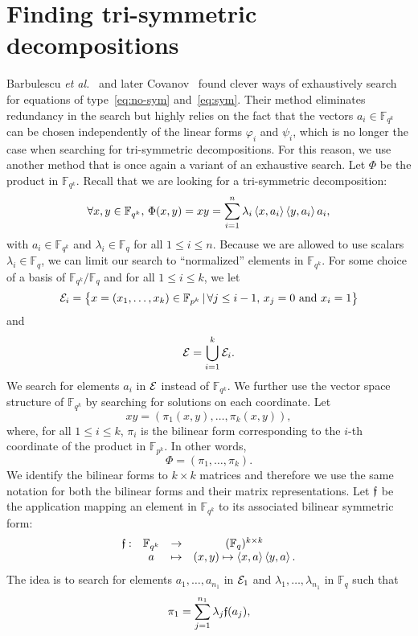 \documentclass[a4paper,11pt]{article}
\begin{document}
\section{Finding tri-symmetric decompositions}
\label{sec:algos}
Barbulescu \emph{et al.}~\cite{BDEZ12} and later Covanov~\cite{Covanov19} found
clever ways of exhaustively search for equations of type~\eqref{eq:no-sym}
and~\eqref{eq:sym}. Their method eliminates redundancy in the search but highly
relies on the fact that the vectors $a_i\in\mathbb{F}_{q^k}$ can be chosen independently of
the linear forms $\varphi_i$ and $\psi_i$, which is no longer
the case when searching for tri-symmetric decompositions. For this reason, we
use another method that is once again a variant of an exhaustive search. Let
$\Phi$ be the product in $\mathbb{F}_{q^k}$. Recall
that we are looking for a tri-symmetric decomposition:
\[
  \forall x, y\in\mathbb{F}_{q^k},\,\Phi(x, y) = xy =
  \sum_{i=1}^{n}\lambda_i\left\langle x,a_i\right\rangle\left\langle y,a_i\right\rangle a_i,
\]
with $a_i\in\mathbb{F}_{q^k}$ and $\lambda_i\in\mathbb{F}_q$ for all $1\leq i
\leq n$. Because we are allowed to use scalars $\lambda_i\in\mathbb{F}_q$, we
can limit our search to ``normalized'' elements in $\mathbb{F}_{q^k}$. For some
choice of a basis of $\mathbb{F}_{q^k}/\mathbb{F}_q$ and for all
$1\leq i\leq k$, we let
\[
  \mathcal{E}_i=\left\{ x=(x_1, \dots, x_k)\in\mathbb{F}_{p^k}
  \,|\, \forall j\leq i-1,\,x_j=0\text{ and }x_i=1 \right\}
\]
and
\[
  \mathcal{E} = \bigcup_{i=1}^k\mathcal{E}_i.
\]
We search for elements $a_i$ in $\mathcal{E}$ instead of $\mathbb{F}_{q^k}$. We further
use the vector space structure of $\mathbb{F}_{q^k}$ by searching for solutions
on each coordinate.
Let 
\[
  xy = (\pi_1(x, y), \dots, \pi_k(x, y)),
\]
where, for all $1\leq i\leq k$, $\pi_i$ is the bilinear form corresponding to
the $i$-th coordinate of the product in $\mathbb{F}_{p^k}$. In other words, 
\[
  \Phi = (\pi_1, \dots, \pi_k).
\]
We identify the
bilinear forms to $k\times k$ matrices and therefore we use the same notation for both the
bilinear forms and their matrix representations. Let $\mathfrak{f}$ be the application mapping an element in
$\mathbb{F}_{q^k}$ to its associated bilinear symmetric form:
\[
\begin{array}{cccc}
  \mathfrak{f}: & \mathbb{F}_{q^k} & \to & (\mathbb{F}_q)^{k\times k} \\
  & a & \mapsto & (x, y)\mapsto \left\langle x,a\right\rangle\left\langle y,a\right\rangle.
\end{array}
\]
The idea is to search for elements $a_1, \dots, a_{n_1}$ in $\mathcal{E}_1$ and
$\lambda_1, \dots, \lambda_{n_1}$ in $\mathbb{F}_q$ such that 
\begin{equation}
  \pi_1 = \sum_{j=1}^{n_1}\lambda_j\mathfrak{f}(a_j),
  \label{eq:pi1}
\end{equation}
\end{document}

